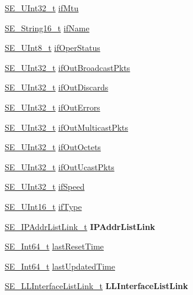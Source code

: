 \begin{DoxyCompactItemize}
\item 
\hyperlink{group__UInt32_ga70bd4ecda3c0c85d20779d685a270cdb}{S\+E\+\_\+\+U\+Int32\+\_\+t} \hyperlink{group__IPInterface_gae6d0c841334279786582a3ceaa179073}{if\+Mtu}
\item 
\hyperlink{group__String16_ga96799b35e03c3e6545eb138a7f879015}{S\+E\+\_\+\+String16\+\_\+t} \hyperlink{group__IPInterface_ga79ab2f8029d3450151664f54dec7c69b}{if\+Name}
\item 
\hyperlink{group__UInt8_gaf7c365a1acfe204e3a67c16ed44572f5}{S\+E\+\_\+\+U\+Int8\+\_\+t} \hyperlink{group__IPInterface_ga76e38ca61efa7e59eca32b9fe63b2609}{if\+Oper\+Status}
\item 
\hyperlink{group__UInt32_ga70bd4ecda3c0c85d20779d685a270cdb}{S\+E\+\_\+\+U\+Int32\+\_\+t} \hyperlink{group__IPInterface_ga4dad26e1a7775e033f822da2980c9715}{if\+Out\+Broadcast\+Pkts}
\item 
\hyperlink{group__UInt32_ga70bd4ecda3c0c85d20779d685a270cdb}{S\+E\+\_\+\+U\+Int32\+\_\+t} \hyperlink{group__IPInterface_gaa49c6bffe8503a33224296f9d6d305e5}{if\+Out\+Discards}
\item 
\hyperlink{group__UInt32_ga70bd4ecda3c0c85d20779d685a270cdb}{S\+E\+\_\+\+U\+Int32\+\_\+t} \hyperlink{group__IPInterface_gae2b2d6d1127135cb87d6b714f97756d0}{if\+Out\+Errors}
\item 
\hyperlink{group__UInt32_ga70bd4ecda3c0c85d20779d685a270cdb}{S\+E\+\_\+\+U\+Int32\+\_\+t} \hyperlink{group__IPInterface_ga7da0c9b44701f1a7d61a18a1c817b68d}{if\+Out\+Multicast\+Pkts}
\item 
\hyperlink{group__UInt32_ga70bd4ecda3c0c85d20779d685a270cdb}{S\+E\+\_\+\+U\+Int32\+\_\+t} \hyperlink{group__IPInterface_ga1f253af09f8037d596246bd0051af347}{if\+Out\+Octets}
\item 
\hyperlink{group__UInt32_ga70bd4ecda3c0c85d20779d685a270cdb}{S\+E\+\_\+\+U\+Int32\+\_\+t} \hyperlink{group__IPInterface_ga9847e8d8b59bc52be1f0db9b1fb7d650}{if\+Out\+Ucast\+Pkts}
\item 
\hyperlink{group__UInt32_ga70bd4ecda3c0c85d20779d685a270cdb}{S\+E\+\_\+\+U\+Int32\+\_\+t} \hyperlink{group__IPInterface_gae1997df959264a39cb3856f623062744}{if\+Speed}
\item 
\hyperlink{group__UInt16_gac68d541f189538bfd30cfaa712d20d29}{S\+E\+\_\+\+U\+Int16\+\_\+t} \hyperlink{group__IPInterface_gaf4e4fb764ff9c6a0fdd5e907aaa1bf54}{if\+Type}
\item 
\hyperlink{structSE__IPAddrListLink__t}{S\+E\+\_\+\+I\+P\+Addr\+List\+Link\+\_\+t} {\bfseries I\+P\+Addr\+List\+Link}
\item 
\hyperlink{group__Int64_ga946a01895d7edbdd190770677f54f2c6}{S\+E\+\_\+\+Int64\+\_\+t} \hyperlink{group__IPInterface_gaba7ccbfae459fd5b6e12f97f3730590f}{last\+Reset\+Time}
\item 
\hyperlink{group__Int64_ga946a01895d7edbdd190770677f54f2c6}{S\+E\+\_\+\+Int64\+\_\+t} \hyperlink{group__IPInterface_gad0d107ce89620b97d98d21a404994324}{last\+Updated\+Time}
\item 
\hyperlink{structSE__LLInterfaceListLink__t}{S\+E\+\_\+\+L\+L\+Interface\+List\+Link\+\_\+t} {\bfseries L\+L\+Interface\+List\+Link}
\end{DoxyCompactItemize}


